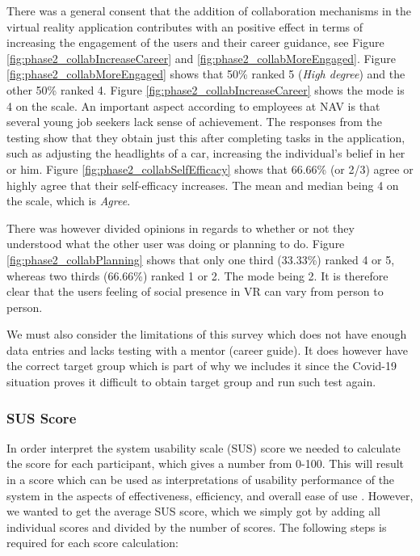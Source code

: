 There was a general consent that the addition of collaboration mechanisms in the virtual reality application contributes with an positive effect in terms of increasing the engagement of the users and their career guidance, see Figure \ref{fig:phase2_collabIncreaseCareer} and \ref{fig:phase2_collabMoreEngaged}. Figure \ref{fig:phase2_collabMoreEngaged} shows that 50\% ranked 5 (\textit{High degree}) and the other 50\% ranked 4. Figure \ref{fig:phase2_collabIncreaseCareer}  shows the mode is 4 on the scale. 
An important aspect according to employees at NAV is that several young job seekers lack sense of achievement. The responses from the testing show that they obtain just this after completing tasks in the application, such as adjusting the headlights of a car, increasing the individual's belief in her or him. Figure \ref{fig:phase2_collabSelfEfficacy} shows that 66.66\% (or 2/3) agree or highly agree that their self-efficacy increases. The mean and median being 4 on the scale, which is \textit{Agree}. 

There was however divided opinions in regards to whether or not they understood what the other user was doing or planning to do. Figure \ref{fig:phase2_collabPlanning} shows that only one third (33.33\%) ranked 4 or 5, whereas two thirds (66.66\%) ranked 1 or 2. The mode being 2. It is therefore clear that the users feeling of social presence in VR can vary from person to person. 

We must also consider the limitations of this survey which does not have enough data entries and lacks testing with a mentor (career guide). It does however have the correct target group which is part of why we includes it since the Covid-19 situation proves it difficult to obtain target group and run such test again.


\subsubsection{SUS Score}
In order interpret the system usability scale (SUS) score we needed to calculate the score for each participant, which gives a number from 0-100. This will result in a score which can be used as interpretations of usability performance of the system in the aspects of effectiveness, efficiency, and overall ease of use \cite{SusMeasuringInterpret}. However, we wanted to get the average SUS score, which we simply got by adding all individual scores and divided by the number of scores. The following steps is required for each score calculation: 


